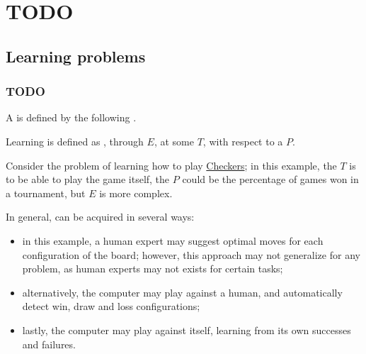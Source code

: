 \documentclass[a4paper, 12pt]{report}
\institute{\curlyquotes{\hspace{0.25mm}Sapienza} Università di Roma}
\subtitle{Appunti integrati con il libro \book}
\author{\textit{Autore}\\\authorName}
\institute{\curlyquotes{\hspace{0.25mm}Sapienza} University of Rome}
\subtitle{Lecture notes integrated with the book \book}
\author{\textit{Author}\\\authorName}
\title{\courseName}
\date{\today}
\begin{document}
    \maketitle

    {
        \hypersetup{allcolors=black}

        \romantableofcontents
    }

    \introduction

    
    \chapter{TODO}
    
    \section{Learning problems}

    \subsection{TODO}
    
    A  is defined by the following .

    \begin{frameddefn}{Learning}
         is defined as , through  $E$, at some  $T$, with respect to a  $P$.
    \end{frameddefn}

    \begin{example}
        Consider the problem of learning how to play \href{https://en.wikipedia.org/wiki/Checkers}{Checkers}; in this example, the  $T$ is to be able to play the game itself, the  $P$ could be the percentage of games won in a tournament, but  $E$ is more complex.
    \end{example}

    In general,  can be acquired in several ways:

    \begin{itemize}
        \item in this example, a human expert may suggest optimal moves for each configuration of the board; however, this approach may not generalize for any problem, as human experts may not exists for certain tasks;
        \item alternatively, the computer may play against a human, and automatically detect win, draw and loss configurations;
        \item lastly, the computer may play against itself, learning from its own successes and failures.
    \end{itemize}
\end{document}

